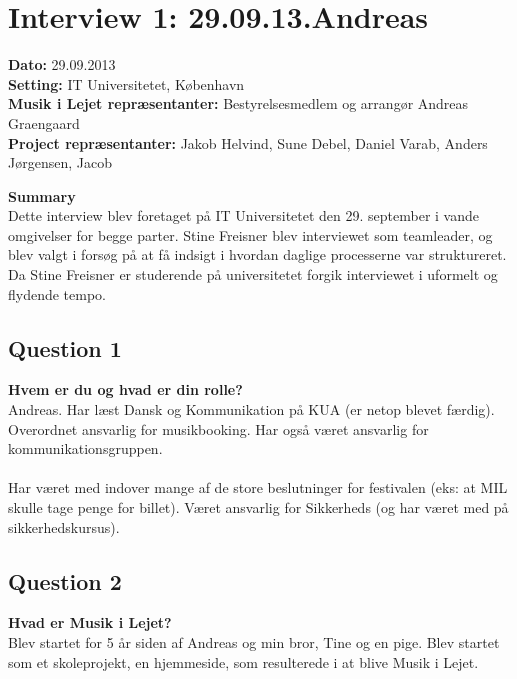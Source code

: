 \section{Interview 1: 29.09.13.Andreas}
\label{interview_1}

\textbf{Dato:} 29.09.2013 \\
\textbf{Setting:} IT Universitetet, København \\
\textbf{Musik i Lejet repræsentanter:} Bestyrelsesmedlem og arrangør Andreas Graengaard  \\
\textbf{Project repræsentanter:} Jakob Helvind, Sune Debel, Daniel Varab, Anders Jørgensen, Jacob 

\bigskip

\noindent \textbf{Summary} \\
Dette interview blev foretaget på IT Universitetet den 29. september i vande omgivelser for begge parter. Stine Freisner blev interviewet som teamleader, og blev valgt i forsøg på at få indsigt i hvordan daglige processerne var struktureret. Da Stine Freisner er studerende på universitetet forgik interviewet i uformelt og flydende tempo.


\subsection{Question 1}
\label{i1q1}
\noindent \textbf{Hvem er du og hvad er din rolle?} \\
Andreas. Har læst Dansk og Kommunikation på KUA (er netop blevet færdig). Overordnet ansvarlig for musikbooking. Har også været ansvarlig for kommunikationsgruppen. 
\\ \\
Har været med indover mange af de store beslutninger for festivalen (eks: at MIL skulle tage penge for billet). Været ansvarlig for Sikkerheds (og har været med på sikkerhedskursus). 

\subsection{Question 2}
\label{i1q2}
\noindent \textbf{Hvad er Musik i Lejet?} \\
Blev startet for 5 år siden af Andreas og min bror, Tine og en pige. Blev startet som et skoleprojekt, en hjemmeside, som resulterede i at blive Musik i Lejet.

